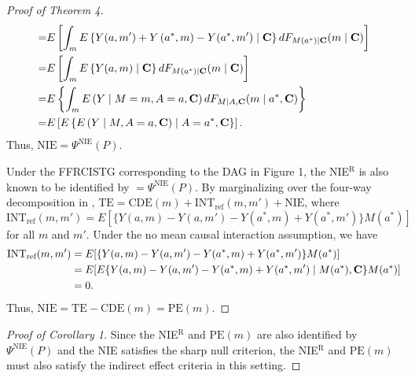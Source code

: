 \documentclass[12pt]{article}
\begin{document}
\begin{proof}[Proof of Theorem 4]
\begin{align*}
        =& E\left[\int_m E\left\{Y(a, m')+Y\left(a^*, m\right)-Y(a^*, m')\mid {\bf C}\right\}dF_{M(a^*)\mid {\bf C}}(m\mid {\bf C})\right]\\
        =& E\left[\int_m E\left\{Y(a, m)\mid {\bf C}\right\}dF_{M(a^*)\mid {\bf C}}(m\mid {\bf C})\right]\\
        =& E\left\{\int_m E\left(Y\mid M=m, A=a, {\bf C}\right)dF_{M\mid A,{\bf C}}(m\mid a^*, {\bf C})\right\}\\
        =& E\left[E\left\{E\left(Y\mid M, A=a, {\bf C}\right)\mid A=a^*, {\bf C}\right\}\right].
    \end{align*}
    Thus, $\text{NIE}=\Psi^{\text{NIE}}(P)$.

    Under the FFRCISTG corresponding to the DAG in Figure 1, the NIE$^{\text{R}}$ is also known to be identified by $=\Psi^{\text{NIE}}(P)$. By marginalizing over the four-way decomposition in \cite{vanderweele2014unification}, $\text{TE} = \text{CDE}(m) + \text{INT}_{\text{ref}}(m,m') + \text{NIE}$, where 
    \[\text{INT}_{\text{ref}}(m,m') = E[\{Y(a,m)-Y(a,m')-Y(a^*,m)+Y(a^*,m')\}M(a^*)]\]
    for all $m$ and $m'$. Under the no mean causal interaction assumption, we have
    \begin{align*}
        \text{INT}_{\text{ref}}(m,m') &= E[\{Y(a,m)-Y(a,m')-Y(a^*,m)+Y(a^*,m')\}M(a^*)] \\
        &= E[E\{Y(a,m)-Y(a,m')-Y(a^*,m)+Y(a^*,m')\mid M(a^*),{\bf C}\}M(a^*)] \\
        &= 0.
    \end{align*}
    Thus, $\text{NIE} = \text{TE} - \text{CDE}(m) = \text{PE}(m)$.
\end{proof}

\begin{proof}[Proof of Corollary 1]
    Since the NIE$^{\text{R}}$ and $\text{PE}(m)$ are also identified by $\Psi^{\text{NIE}}(P)$ and the NIE satisfies the sharp null criterion, the NIE$^{\text{R}}$ and $\text{PE}(m)$ must also satisfy the indirect effect criteria in this setting.
\end{proof}
\end{document}
